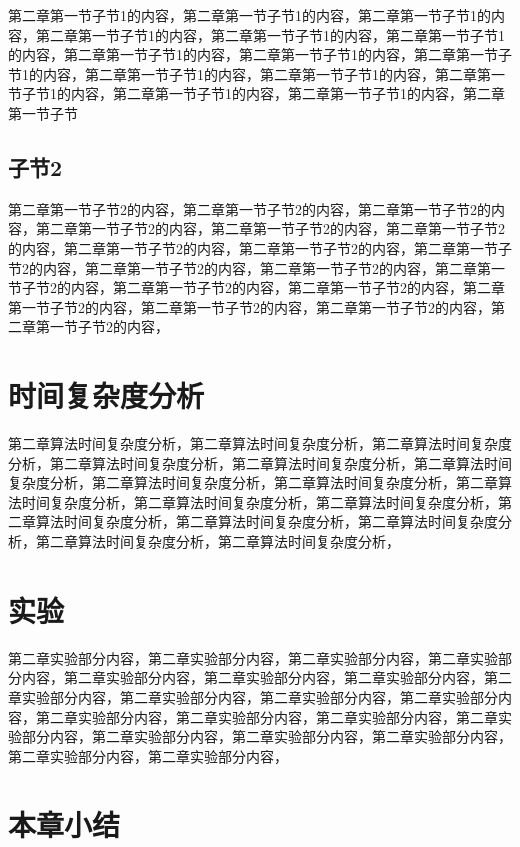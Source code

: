 \documentclass[unicode,pdfcover]{hquthesis}
\begin{document}
第二章第一节子节1的内容，第二章第一节子节1的内容，第二章第一节子节1的内容，第二章第一节子节1的内容，第二章第一节子节1的内容，第二章第一节子节1的内容，第二章第一节子节1的内容，第二章第一节子节1的内容，第二章第一节子节1的内容，第二章第一节子节1的内容，第二章第一节子节1的内容，第二章第一节子节1的内容，第二章第一节子节1的内容，第二章第一节子节1的内容，第二章第一节子节

\subsection{子节2}

第二章第一节子节2的内容，第二章第一节子节2的内容，第二章第一节子节2的内容，第二章第一节子节2的内容，第二章第一节子节2的内容，第二章第一节子节2的内容，第二章第一节子节2的内容，第二章第一节子节2的内容，第二章第一节子节2的内容，第二章第一节子节2的内容，第二章第一节子节2的内容，第二章第一节子节2的内容，第二章第一节子节2的内容，第二章第一节子节2的内容，第二章第一节子节2的内容，第二章第一节子节2的内容，第二章第一节子节2的内容，第二章第一节子节2的内容，

\section{时间复杂度分析}

第二章算法时间复杂度分析，第二章算法时间复杂度分析，第二章算法时间复杂度分析，第二章算法时间复杂度分析，第二章算法时间复杂度分析，第二章算法时间复杂度分析，第二章算法时间复杂度分析，第二章算法时间复杂度分析，第二章算法时间复杂度分析，第二章算法时间复杂度分析，第二章算法时间复杂度分析，第二章算法时间复杂度分析，第二章算法时间复杂度分析，第二章算法时间复杂度分析，第二章算法时间复杂度分析，第二章算法时间复杂度分析，

\section{实验}
第二章实验部分内容，第二章实验部分内容，第二章实验部分内容，第二章实验部分内容，第二章实验部分内容，第二章实验部分内容，第二章实验部分内容，第二章实验部分内容，第二章实验部分内容，第二章实验部分内容，第二章实验部分内容，第二章实验部分内容，第二章实验部分内容，第二章实验部分内容，第二章实验部分内容，第二章实验部分内容，第二章实验部分内容，第二章实验部分内容，第二章实验部分内容，第二章实验部分内容，

\section{本章小结}
\end{document}
